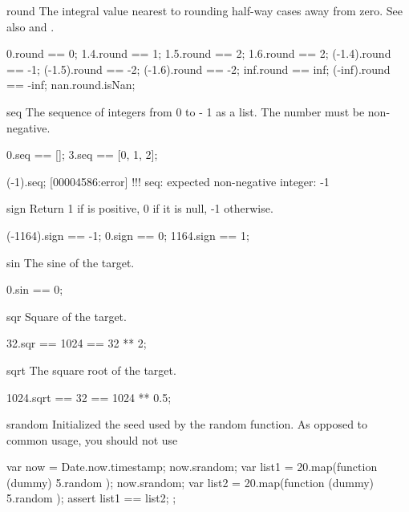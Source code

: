 \begin{urbiscriptapi}
\item[round] The integral value nearest to \this rounding half-way cases
  away from zero.  See also  and .
\begin{urbiassert}
     0.round ==  0;
   1.4.round ==  1;     1.5.round ==  2;    1.6.round ==  2;
(-1.4).round == -1;  (-1.5).round == -2; (-1.6).round == -2;
   inf.round == inf; (-inf).round == -inf;
   nan.round.isNan;
\end{urbiassert}

\item[seq]
  The sequence of integers from 0 to \this - 1 as a list.
  The number must be non-negative.
\begin{urbiassert}
0.seq == [];  3.seq == [0, 1, 2];

(-1).seq;
[00004586:error] !!! seq: expected non-negative integer: -1
\end{urbiassert}

\item[sign]
  Return 1 if \this is positive, 0 if it is null, -1
  otherwise.
\begin{urbiassert}
(-1164).sign == -1;
      0.sign ==  0;
   1164.sign ==  1;
\end{urbiassert}

\item[sin]
  The sine of the target.
\begin{urbiassert}
0.sin == 0;
\end{urbiassert}

\item[sqr]
  Square of the target.
\begin{urbiassert}
32.sqr == 1024 == 32 ** 2;
\end{urbiassert}

\item[sqrt]
  The square root of the target.
\begin{urbiassert}
1024.sqrt == 32 == 1024 ** 0.5;
\end{urbiassert}

\item[srandom]
  Initialized the seed used by the random function.  As opposed to common
  usage, you should not use
\begin{urbiunchecked}
{
  var now = Date.now.timestamp;
  now.srandom;
  var list1 = 20.map(function (dummy) { 5.random });
  now.srandom;
  var list2 = 20.map(function (dummy) { 5.random });
  assert
  {
    list1 == list2;
  }
};
\end{urbiunchecked}


\end{urbiscriptapi}
